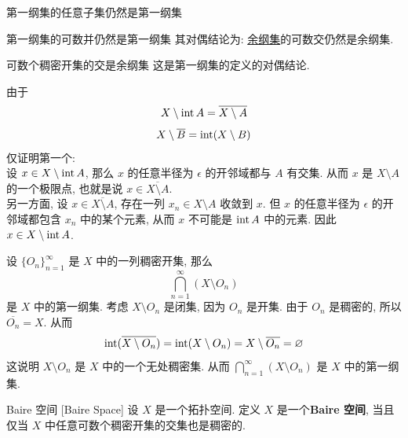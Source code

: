         \begin{ppt}
            {第一纲集的任意子集仍然是第一纲集}
        \end{ppt}

        \begin{ppt}
            {第一纲集的可数并仍然是第一纲集}
            其对偶结论为: \hyperref[dfn:residual]{余纲集}的可数交仍然是余纲集.
        \end{ppt}

        \begin{ppt}
            {可数个稠密开集的交是余纲集}
            这是第一纲集的定义的对偶结论.
        \end{ppt}

        \begin{rmk}
            由于
            \[X\setminus\operatorname{int} A=\overline{X\setminus A}\]
            \[X\setminus\overline{B}=\operatorname{int}(X\setminus B) \]
            仅证明第一个:\\
            设 \(x\in X\setminus\operatorname{int} A\), 那么 \(x\) 的任意半径为 \(\epsilon\) 的开邻域都与 \(A\) 有交集. 从而 \(x\) 是 \(X\setminus A\) 的一个极限点, 也就是说 \(x\in\overline{X\setminus A}\). \\
            另一方面, 设 \(x\in \overline{X\setminus A}\), 存在一列 \(x_n\in X\setminus A\) 收敛到 \(x\). 但 \(x\) 的任意半径为 \(\epsilon\) 的开邻域都包含 \(x_n\) 中的某个元素, 从而 \(x\) 不可能是 \(\operatorname{int} A\) 中的元素. 因此 \(x\in X\setminus\operatorname{int} A\).
        \end{rmk}

        \begin{rmk}
             设 \(\{O_n\}_{n=1}^{\infty}\) 是 \(X\) 中的一列稠密开集, 那么
            \[\bigcap_{n=1}^{\infty} (X\setminus O_n)\]
            是 \(X\) 中的第一纲集. 考虑 \(X\setminus O_n\) 是闭集, 因为 \(O_n\) 是开集. 由于 \(O_n\) 是稠密的, 所以 \(\overline{O_n}=X\). 从而
            \[\operatorname{int}(\overline{X\setminus O_n})=\operatorname{int}(X\setminus O_n)=X\setminus\overline{O_n}=\varnothing\]
            这说明 \(X\setminus O_n\) 是 \(X\) 中的一个无处稠密集. 从而 \(\bigcap_{n=1}^{\infty} (X\setminus O_n)\) 是 \(X\) 中的第一纲集.
        \end{rmk}

        \begin{dfn}
            {Baire 空间}
            [Baire Space]
            设 \(X\) 是一个拓扑空间. 定义 \(X\) 是一个\textbf{Baire 空间}, 当且仅当 \(X\) 中任意可数个稠密开集的交集也是稠密的.
        \end{dfn}

